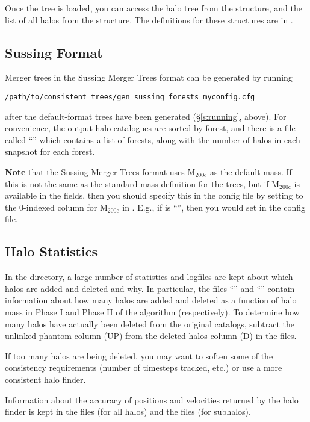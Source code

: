 \documentclass[12pt]{article}
\begin{document}
      Once the tree is loaded, you can access the halo tree from the
       structure, and the list of all halos from the 
      structure.  The definitions for these structures are in .

  \subsection{Sussing Format}
      Merger trees in the Sussing Merger Trees format can be generated by
      running
\begin{verbatim}
/path/to/consistent_trees/gen_sussing_forests myconfig.cfg
\end{verbatim}
      after the default-format trees have been generated (\S\ref{s:running}, above).
      For convenience, the output halo catalogues are sorted by forest,
      and there is a file called ``'' which contains a 
      list of forests, along with the number of halos in each snapshot
      for each forest.

      \textbf{Note} that the Sussing Merger Trees format uses M$_\mathrm{200c}$ as the
      default mass.  If this is not the same as the standard mass definition for the trees, but if
        M$_\mathrm{200c}$ is available in the  fields, then you should 
        specify this in the config file by setting  
      to the 0-indexed column for M$_\mathrm{200c}$ in .  E.g., if
       is ``'', then you would
      set  in the config file.

\subsection{Halo Statistics}
      In the  directory, a large number of statistics and logfiles are
      kept about which halos are added and deleted and why.  In particular,
      the files ``'' and ``'' contain
      information about how many halos are added and deleted as a function
      of halo mass in Phase I and Phase II of the algorithm (respectively).
      To determine how many halos have actually been deleted from the original
      catalogs, subtract the unlinked phantom column (UP) from the deleted halos
      column (D) in the  files.

      If too many halos are being deleted, you may want to soften some of the
      consistency requirements (number of timesteps tracked, etc.) or use a
      more consistent halo finder. \ttt{;-)}

      Information about the accuracy of positions and velocities returned
      by the halo finder is kept in the  files (for all halos)
      and the  files (for subhalos).
\end{document}

